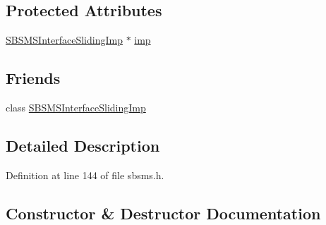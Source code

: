 \subsection*{Protected Attributes}
\begin{DoxyCompactItemize}
\item 
\hyperlink{class__sbsms___1_1_s_b_s_m_s_interface_sliding_imp}{S\+B\+S\+M\+S\+Interface\+Sliding\+Imp} $\ast$ \hyperlink{class__sbsms___1_1_s_b_s_m_s_interface_sliding_aad311527b2799d6a0ea68e13680fe89c}{imp}
\end{DoxyCompactItemize}
\subsection*{Friends}
\begin{DoxyCompactItemize}
\item 
class \hyperlink{class__sbsms___1_1_s_b_s_m_s_interface_sliding_adc230bd4d7aa322e1eebabb120efc68c}{S\+B\+S\+M\+S\+Interface\+Sliding\+Imp}
\end{DoxyCompactItemize}


\subsection{Detailed Description}


Definition at line 144 of file sbsms.\+h.



\subsection{Constructor \& Destructor Documentation}
